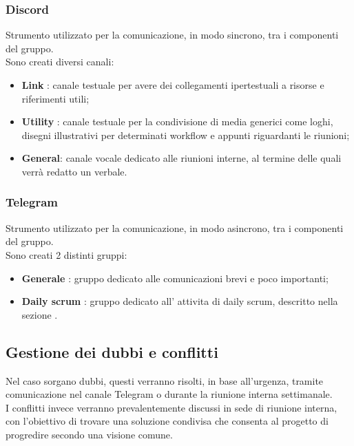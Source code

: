 \subsubsection{Discord}
Strumento utilizzato per la comunicazione, in modo sincrono, tra i componenti
del gruppo.\\ Sono creati diversi canali:
\begin{itemize}
    \item \textbf{Link} : canale testuale per avere dei collegamenti ipertestuali a risorse e riferimenti utili;
    \item \textbf{Utility} : canale testuale per la condivisione di media generici come loghi, disegni illustrativi per determinati workflow e appunti riguardanti le riunioni;
    \item \textbf{General}: canale vocale dedicato alle riunioni interne, al termine delle quali verrà redatto un verbale.
\end{itemize}

\subsubsection{Telegram}
Strumento utilizzato per la comunicazione, in modo asincrono, tra i componenti
del gruppo.\\ Sono creati 2 distinti gruppi:
\begin{itemize}
    \item \textbf{Generale} : gruppo dedicato alle comunicazioni brevi e poco importanti;
    \item \textbf{Daily scrum} : gruppo dedicato all' attivita di daily scrum, descritto nella sezione .
\end{itemize}

\subsection{Gestione dei dubbi e conflitti}
Nel caso sorgano dubbi, questi verranno risolti, in base all'urgenza, tramite
comunicazione nel canale Telegram o durante la riunione interna settimanale. \\
I conflitti invece verranno prevalentemente discussi in sede di riunione
interna, con l'obiettivo di trovare una soluzione condivisa che consenta al
progetto di progredire secondo una visione comune.

